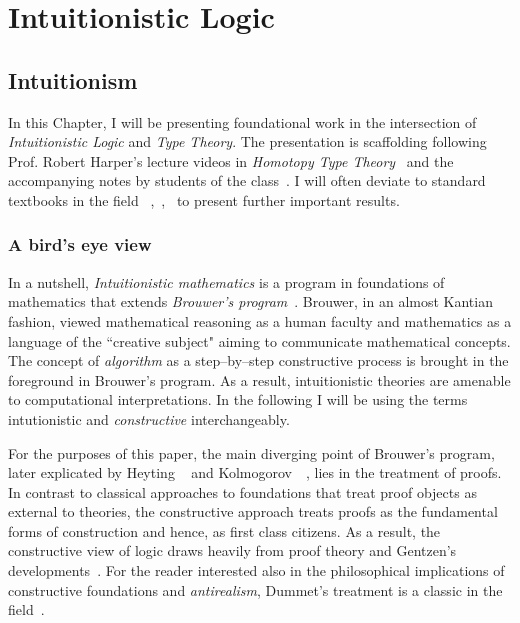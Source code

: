 \chapter{Intuitionistic Logic}\label{intui}
\section{Intuitionism}\label{sec:intrui}
In this Chapter, I will be presenting foundational work in the intersection of \emph{Intuitionistic Logic} and \emph{Type Theory}. The presentation is scaffolding following Prof. Robert Harper's lecture videos in \emph{Homotopy Type Theory}~\cite{HarperHOTT} and the accompanying notes by students of the class~\cite{HOTTNotes1}. I will often deviate to standard textbooks in the field ~\cite{Barendregt1984-BARTLC},~\cite{citeulike:993095},~\cite{Pierce:2002:TPL:509043} to present further important results. 
\subsection{A bird's eye view}  
In a nutshell, \emph{Intuitionistic mathematics}  is a program in foundations 
of mathematics  that extends \emph{Brouwer's program}~\cite{brouwer1975collected}.
Brouwer, in an almost Kantian fashion, viewed mathematical reasoning as a human faculty 
and mathematics as a language of the ``creative subject"
aiming to communicate mathematical concepts. 
The concept of \emph{algorithm} as a step--by--step constructive process is brought in the 
foreground in Brouwer's program. As a result, intuitionistic theories are amenable to 
computational interpretations. In the following I will be using the terms intutionistic 
and \emph{constructive} interchangeably.  

For the purposes of this paper, the main diverging point of Brouwer's program, 
later explicated by Heyting ~\cite{heyting1966intuitionism} and Kolmogorov~\cite{kolmogorov1925principe}~\cite{artemov2004kolmogorov}, lies in the treatment of proofs. In contrast to classical approaches to foundations 
that treat proof objects as external to theories, the constructive approach treats proofs 
as the fundamental forms of construction and hence, as first class citizens. 
As a result, the constructive view of logic draws heavily from proof theory
and Gentzen's developments~\cite{gentzen1970collected}. 
For the reader interested also in the philosophical implications  
of constructive foundations and \emph{antirealism}, 
Dummet's treatment is a classic in the field~\cite{dummett2000elements}.    
 


